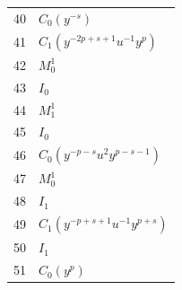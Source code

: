 \begin{longtable}{r@{\qquad}l}
40 & $C_{0}(y^{-s})$\\
41 & $C_{1}(y^{-2p+s+1}u^{-1}y^{p})$\\
42 & $M_{0}^{1}$\\
43 & $I_{0}$\\
44 & $M_{1}^{1}$\\
45 & $I_{0}$\\
46 & $C_{0}(y^{-p-s}u^{2}y^{p-s-1})$\\
47 & $M_{0}^{1}$\\
48 & $I_{1}$\\
49 & $C_{1}(y^{-p+s+1}u^{-1}y^{p+s})$\\
50 & $I_{1}$\\
51 & $C_{0}(y^{p})$\\
\bottomrule
\end{longtable}
